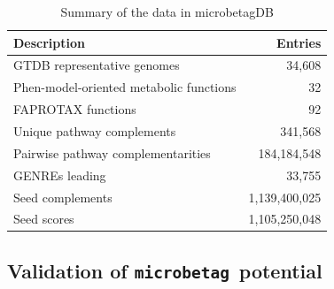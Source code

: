 \documentclass[sn-mathphys,Numbered]{sn-jnl}  %
\theoremstyle{thmstyleone}%
\theoremstyle{thmstyletwo}%
\theoremstyle{thmstylethree}%
\newcommand{\microbetag}{\texttt{microbetag }}
\begin{document}
        \begin{table}[h!]
            \caption[Summary of Data]{
                Summary of the data in microbetagDB
            }
            \label{tab:db}
            \begin{tabular}{lr}
                \toprule
                Description & Entries \\
                \midrule
                GTDB representative genomes & 34,608 \\
                Phen-model-oriented metabolic functions & 32 \\
                FAPROTAX functions & 92 \\
                Unique pathway complements & 341,568 \\
                Pairwise pathway complementarities & 184,184,548\\
                GENREs leading  & 33,755 \\
                Seed complements & 1,139,400,025\\
                Seed scores & 1,105,250,048 \\
                \bottomrule
            \end{tabular}
        \end{table}




        


    \subsection*{Validation of \microbetag potential}
    \label{subsec:validation}
\end{document}
